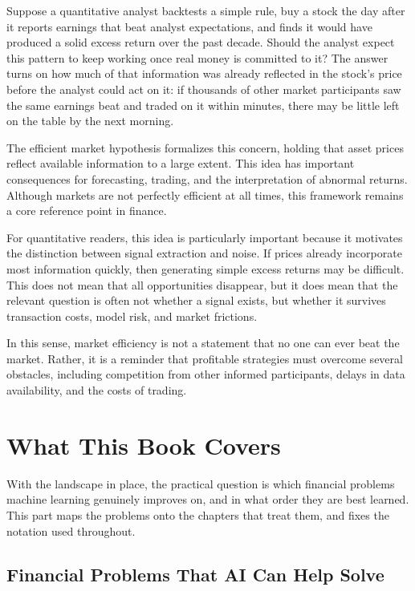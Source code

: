 \documentclass[../ai_in_finance]{subfiles}
\begin{document}
Suppose a quantitative analyst backtests a simple rule, buy a stock the day after it reports earnings that beat analyst expectations, and finds it would have produced a solid excess return over the past decade. Should the analyst expect this pattern to keep working once real money is committed to it? The answer turns on how much of that information was already reflected in the stock's price before the analyst could act on it: if thousands of other market participants saw the same earnings beat and traded on it within minutes, there may be little left on the table by the next morning.

The efficient market hypothesis formalizes this concern, holding that asset prices reflect available information to a large extent. This idea has important consequences for forecasting, trading, and the interpretation of abnormal returns. Although markets are not perfectly efficient at all times, this framework remains a core reference point in finance.

For quantitative readers, this idea is particularly important because it motivates the distinction between signal extraction and noise. If prices already incorporate most information quickly, then generating simple excess returns may be difficult. This does not mean that all opportunities disappear, but it does mean that the relevant question is often not whether a signal exists, but whether it survives transaction costs, model risk, and market frictions.

In this sense, market efficiency is not a statement that no one can ever beat the market. Rather, it is a reminder that profitable strategies must overcome several obstacles, including competition from other informed participants, delays in data availability, and the costs of trading.

\section{What This Book Covers}

With the landscape in place, the practical question is which financial problems machine learning genuinely improves on, and in what order they are best learned. This part maps the problems onto the chapters that treat them, and fixes the notation used throughout.

\subsection{Financial Problems That AI Can Help Solve}
\end{document}
